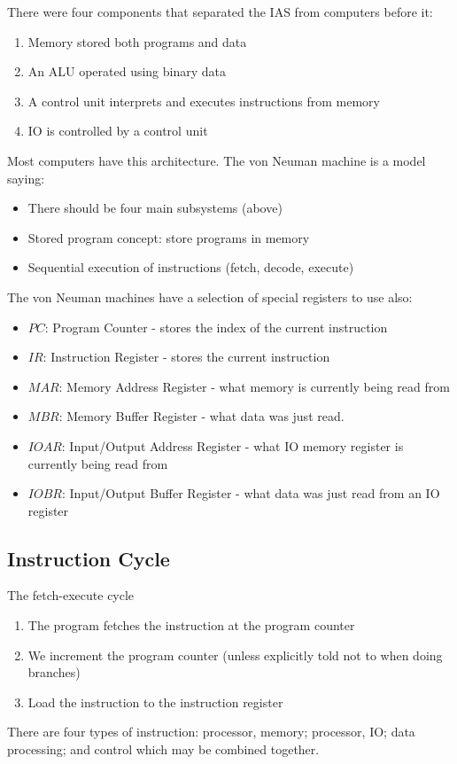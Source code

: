 There were four components that separated the IAS from computers before it:
\begin{enumerate}
	\item Memory stored both programs and data
	\item An ALU operated using binary data
	\item A control unit interprets and executes instructions from memory
	\item IO is controlled by a control unit
\end{enumerate}
%
Most computers have this architecture.
The von Neuman machine is a model saying:
\begin{itemize}
	\item There should be four main subsystems (above)
	\item Stored program concept: store programs in memory
	\item Sequential execution of instructions (fetch, decode, execute)
\end{itemize}
%
The von Neuman machines have a selection of special registers to use also:
\begin{itemize}
	\item \(PC\): Program Counter - stores the index of the current instruction
	\item \(IR\): Instruction Register - stores the current instruction
	\item \(MAR\): Memory Address Register - what memory is currently being read from
	\item \(MBR\): Memory Buffer Register - what data was just read.
	\item \(IO AR\): Input/Output Address Register - what IO memory register is currently being read from
	\item \(IO BR\): Input/Output Buffer Register - what data was just read from an IO register
\end{itemize}

\subsection{Instruction Cycle}\label{sub:instruction_cycle}

\begin{highlight}{The fetch-execute cycle}
\end{highlight}
\begin{enumerate}
	\item The program fetches the instruction at the program counter
	\item We increment the program counter (unless explicitly told not to when doing branches)
	\item Load the instruction to the instruction register
\end{enumerate}
%
There are four types of instruction: processor, memory; processor, IO; data processing; and control which may be combined together.
